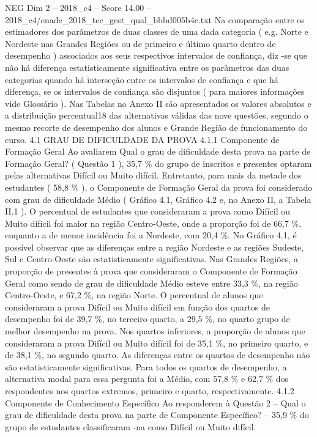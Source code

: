 \begin{textsample}{NEG Dim 2 – 2018\_c4 – Score 14.00 – 2018\_c4/enade\_2018\_tec\_gest\_qual\_bbbd005b4c.txt}
Na comparação entre os estimadores dos parâmetros de duas classes de uma dada categoria ( e.g.
Norte e Nordeste nas Grandes Regiões ou de primeiro e último quarto dentro de desempenho ) associados aos seus respectivos intervalos de confiança, diz -se que não há diferença estatisticamente significativa entre os parâmetros das duas categorias quando há interseção entre os intervalos de confiança e que há diferença, se os intervalos de confiança são disjuntos ( para maiores informações vide Glossário ).
Nas Tabelas no Anexo II são apresentados os valores absolutos e a distribuição percentual18 das alternativas válidas das nove questões, segundo o mesmo recorte de desempenho dos alunos e Grande Região de funcionamento do curso. 4.1 GRAU DE DIFICULDADE DA PROVA 4.1.1 Componente de Formação Geral Ao avaliarem Qual o grau de dificuldade desta prova na parte de Formação Geral? ( Questão 1 ), 35,7 \% do grupo de inscritos e presentes optaram pelas alternativas Difícil ou Muito difícil.
Entretanto, para mais da metade dos estudantes ( 58,8 \% ), o Componente de Formação Geral da prova foi considerado com grau de dificuldade Médio ( Gráfico 4.1, Gráfico 4.2 e, no Anexo II, a Tabela II.1 ).
O percentual de estudantes que consideraram a prova como Difícil ou Muito difícil foi maior na região Centro-Oeste, onde a proporção foi de 66,7 \%, enquanto a de menor incidência foi a Nordeste, com 20,4 \%.
No Gráfico 4.1, é possível observar que as diferenças entre a região Nordeste e as regiões Sudeste, Sul e Centro-Oeste são estatisticamente significativas.
Nas Grandes Regiões, a proporção de presentes à prova que consideraram o Componente de Formação Geral como sendo de grau de dificuldade Médio esteve entre 33,3 \%, na região Centro-Oeste, e 67,2 \%, na região Norte.
O percentual de alunos que consideraram a prova Difícil ou Muito difícil em função dos quartos de desempenho foi de 39,7 \%, no terceiro quarto, a 29,5 \%, no quarto grupo de melhor desempenho na prova.
Nos quartos inferiores, a proporção de alunos que consideraram a prova Difícil ou Muito difícil foi de 35,1 \%, no primeiro quarto, e de 38,1 \%, no segundo quarto.
As diferenças entre os quartos de desempenho não são estatisticamente significativas.
Para todos os quartos de desempenho, a alternativa modal para essa pergunta foi a Médio, com 57,8 \% e 62,7 \% dos respondentes nos quartos extremos, primeiro e quarto, respectivamente. 4.1.2 Componente de Conhecimento Específico Ao responderem à Questão 2 – Qual o grau de dificuldade desta prova na parte de Componente Específico? – 35,9 \% do grupo de estudantes classificaram -na como Difícil ou Muito difícil.

\end{textsample}

